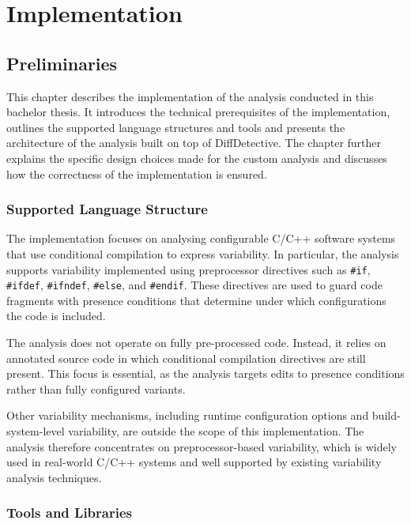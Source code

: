 \chapter{Implementation}
\label{chp:implementation}
\section{Preliminaries}
This chapter describes the implementation of the analysis conducted in this bachelor thesis. It introduces the technical prerequisites of the implementation, outlines the supported language structures and tools and presents the architecture of the analysis built on top of DiffDetective. The chapter further explains the specific design choices made for the custom analysis and discusses how the correctness of the implementation is ensured.

\subsection{Supported Language Structure}

The implementation focuses on analysing configurable C/C++ software systems that use conditional compilation to express variability. In particular, the analysis supports variability implemented using preprocessor directives such as \texttt{\#if}, \texttt{\#ifdef}, \texttt{\#ifndef}, \texttt{\#else}, and \texttt{\#endif}. These directives are used to guard code fragments with presence conditions that determine under which configurations the code is included.

The analysis does not operate on fully pre-processed code. Instead, it relies on annotated source code in which conditional compilation directives are still present. This focus is essential, as the analysis targets edits to presence conditions rather than fully configured variants.

Other variability mechanisms, including runtime configuration options and build-system-level variability, are outside the scope of this implementation. The analysis therefore concentrates on preprocessor-based variability, which is widely used in real-world C/C++ systems and well supported by existing variability analysis techniques.

\subsection{Tools and Libraries}

